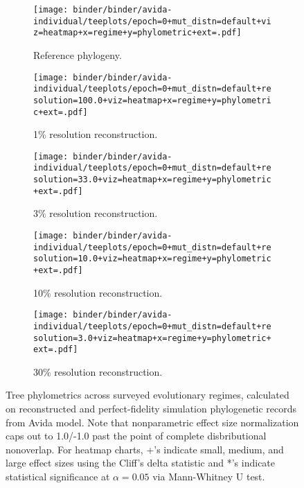 \begin{figure*}
  \centering
  \begin{subfigure}[b]{\textwidth}
    \texttt{[image: binder/binder/avida-individual/teeplots/epoch=0+mut\_distn=default+viz=heatmap+x=regime+y=phylometric+ext=.pdf]}
    \caption{Reference phylogeny.}
  \end{subfigure}%
\begin{subfigure}[b]{\textwidth}
  \texttt{[image: binder/binder/avida-individual/teeplots/epoch=0+mut\_distn=default+resolution=100.0+viz=heatmap+x=regime+y=phylometric+ext=.pdf]}
  \caption{1\% resolution reconstruction.}
\end{subfigure}%
\begin{subfigure}[b]{\textwidth}
  \texttt{[image: binder/binder/avida-individual/teeplots/epoch=0+mut\_distn=default+resolution=33.0+viz=heatmap+x=regime+y=phylometric+ext=.pdf]}
  \caption{3\% resolution reconstruction.}
\end{subfigure}%
\begin{subfigure}[b]{\textwidth}
  \texttt{[image: binder/binder/avida-individual/teeplots/epoch=0+mut\_distn=default+resolution=10.0+viz=heatmap+x=regime+y=phylometric+ext=.pdf]}
  \caption{10\% resolution reconstruction.}
\end{subfigure}%
\begin{subfigure}[b]{\textwidth}
  \texttt{[image: binder/binder/avida-individual/teeplots/epoch=0+mut\_distn=default+resolution=3.0+viz=heatmap+x=regime+y=phylometric+ext=.pdf]}
  \caption{30\% resolution reconstruction.}
\end{subfigure}%
  \caption{
Tree phylometrics across surveyed evolutionary regimes, calculated on reconstructed and perfect-fidelity simulation phylogenetic records from Avida model.
Note that nonparametric effect size normalization caps out to 1.0/-1.0 past the point of complete disbributional nonoverlap.
For heatmap charts, +'s indicate small, medium, and large effect sizes using the Cliff's delta statistic and *'s indicate statistical significance at $\alpha = 0.05$ via Mann-Whitney U test.
  }
  \label{fig:reconstructed-tree-phylometrics-progressive-heatmap-avida}
\end{figure*}